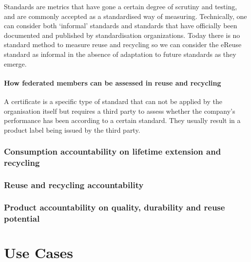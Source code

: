 \documentclass[
]{book}
\begin{document}
Standards are metrics that have gone a certain degree of scrutiny and testing, and are commonly accepted as a standardised way of measuring. Technically, one can consider both `informal' standards and standards that have officially been documented and published by standardisation organizations. Today there is no standard method to measure reuse and recycling so we can consider the eReuse standard as informal in the absence of adaptation to future standards as they emerge.

\hypertarget{how-federated-members-can-be-assessed-in-reuse-and-recycling}{%
\subsubsection{How federated members can be assessed in reuse and recycling}\label{how-federated-members-can-be-assessed-in-reuse-and-recycling}}

A certificate is a specific type of standard that can not be applied by the organisation itself but requires a third party to assess whether the company's performance has been according to a certain standard. They usually result in a product label being issued by the third party.

\hypertarget{consumption-accountability-on-lifetime-extension-and-recycling}{%
\subsection{Consumption accountability on lifetime extension and recycling}\label{consumption-accountability-on-lifetime-extension-and-recycling}}

\hypertarget{reuse-and-recycling-accountability}{%
\subsection{Reuse and recycling accountability}\label{reuse-and-recycling-accountability}}

\hypertarget{product-accountability-on-quality-durability-and-reuse-potential}{%
\subsection{Product accountability on quality, durability and reuse potential}\label{product-accountability-on-quality-durability-and-reuse-potential}}

\hypertarget{use-cases}{%
\chapter{Use Cases}\label{use-cases}}
\end{document}
